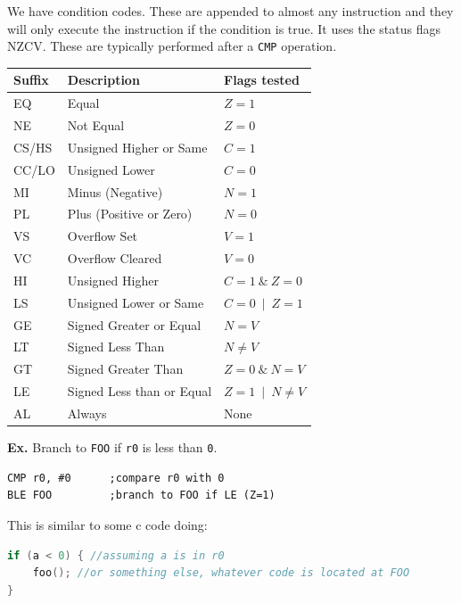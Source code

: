 \documentclass[12pt,letterpaper]{article} \usepackage{amsmath} \usepackage{graphicx} \usepackage[margin=1in]{geometry} \usepackage{longtable}  \usepackage{amssymb}
\begin{document}
	We have condition codes. These are appended to almost any instruction and they will only execute the instruction if the condition is true. It uses the status flags NZCV. These are typically performed after a \verb|CMP| operation.
	\begin{center}
		\begin{tabular}{|l|l|l|}
			\hline
			Suffix & Description & Flags tested \\
			\hline
			EQ    & Equal                       & $Z = 1$ \\
			NE    & Not Equal                   & $Z = 0$ \\
			CS/HS & Unsigned Higher or Same     & $C = 1$ \\
			CC/LO & Unsigned Lower              & $C = 0$ \\
			MI    & Minus (Negative)            & $N = 1$ \\
			PL    & Plus (Positive or Zero)     & $N = 0$ \\
			VS    & Overflow Set                & $V = 1$ \\
			VC    & Overflow Cleared            & $V = 0$ \\
			HI    & Unsigned Higher             & $C = 1 \ \&\ Z = 0$ \\
			LS    & Unsigned Lower or Same      & $C = 0 \ \mid\ Z = 1$ \\
			GE    & Signed Greater or Equal     & $N = V$ \\
			LT    & Signed Less Than            & $N \neq V$ \\
			GT    & Signed Greater Than         & $Z = 0 \ \&\ N = V$ \\
			LE    & Signed Less than or Equal   & $Z = 1 \ \mid\ N \neq V$ \\
			AL    & Always                      & None \\
			\hline
		\end{tabular}
		
	\end{center}
	\begin{mdframed}
		\textbf{Ex.} Branch to \verb*|FOO| if \verb*|r0| is less than \verb*|0|.
		\begin{lstlisting}
CMP r0, #0		;compare r0 with 0
BLE FOO 		;branch to FOO if LE (Z=1)
		\end{lstlisting}
		
		This is similar to some c code doing:
		\begin{lstlisting}[language=c]
if (a < 0) { //assuming a is in r0
	foo(); //or something else, whatever code is located at FOO
}
		\end{lstlisting}
	\end{mdframed}
	
\end{document}
